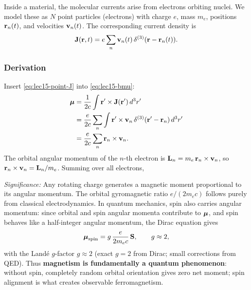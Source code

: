 Inside a material, the molecular currents arise from electrons orbiting nuclei.
We model these as $N$ point particles (electrons) with charge $e$, mass $m_e$,
positions $\mathbf{r}_n(t)$, and velocities $\mathbf{v}_n(t)$.  The corresponding current
density is
\begin{equation}\label{eq:lec15-point-J}
  \mathbf{J}(\mathbf{r},t) = e\sum_n \mathbf{v}_n(t)\,\delta^{(3)}(\mathbf{r} - \mathbf{r}_n(t)).
\end{equation}

\subsubsection*{Derivation}

Insert \eqref{eq:lec15-point-J} into \eqref{eq:lec15-bmu}:
\begin{align}
  \boldsymbol{\mu} &= \frac{1}{2c}\int\mathbf{r}'\times\mathbf{J}(\mathbf{r}')\,d^3r' \notag\\
       &= \frac{e}{2c}\sum_n\int\mathbf{r}'\times\mathbf{v}_n\,\delta^{(3)}(\mathbf{r}'-\mathbf{r}_n)\,d^3r' \notag\\
       &= \frac{e}{2c}\sum_n \mathbf{r}_n\times\mathbf{v}_n. \label{eq:lec15-bmu-electrons}
\end{align}
The orbital angular momentum of the $n$-th electron is $\mathbf{L}_n = m_e\,\mathbf{r}_n\times\mathbf{v}_n$,
so $\mathbf{r}_n\times\mathbf{v}_n = \mathbf{L}_n/m_e$.  Summing over all electrons,


\textit{Significance:} Any rotating charge generates a magnetic moment proportional to
its angular momentum.  The orbital gyromagnetic ratio $e/(2m_e c)$ follows purely from
classical electrodynamics.  In quantum mechanics, spin also carries angular momentum:
since orbital and spin angular momenta contribute to $\boldsymbol{\mu}$, and spin behaves like a
half-integer angular momentum, the Dirac equation gives
\begin{equation}\label{eq:lec15-spin-mu}
  \boldsymbol{\mu}_{\rm spin} = g\,\frac{e}{2m_e c}\,\mathbf{S}, \qquad g \approx 2,
\end{equation}
with the Landé $g$-factor $g \approx 2$ (exact $g=2$ from Dirac; small corrections from
QED).  Thus \textbf{magnetism is fundamentally a quantum phenomenon}: without spin,
completely random orbital orientation gives zero net moment; spin alignment is what
creates observable ferromagnetism.

